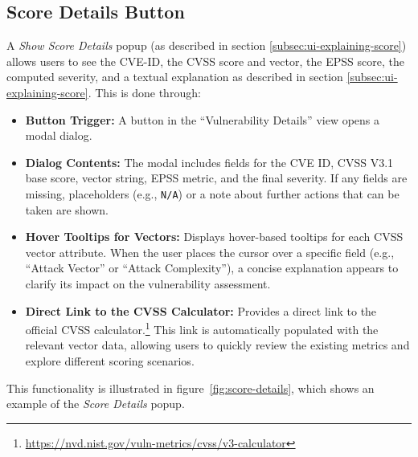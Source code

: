 \subsection{Score Details Button}
A \textit{Show Score Details} popup (as described in section \ref{subsec:ui-explaining-score}) allows users to see the \ac{CVE}-ID, the \ac{CVSS} score and vector, the \ac{EPSS} score, the computed severity, and a textual explanation as described in section \ref{subsec:ui-explaining-score}. This is done through:

\begin{itemize}
  \item \textbf{Button Trigger:} A button in the \enquote{Vulnerability Details} view opens a modal dialog.
  \item \textbf{Dialog Contents:} The modal includes fields for the \ac{CVE} ID, \ac{CVSS} V3.1 base score, vector string, \ac{EPSS} metric, and the final severity. If any fields are missing, placeholders (e.g., \texttt{N/A}) or a note about further actions that can be taken are shown.
  \item \textbf{Hover Tooltips for Vectors:} Displays hover-based tooltips for each \ac{CVSS} vector attribute. When the user places the cursor over a specific field (e.g., \enquote{Attack Vector} or \enquote{Attack Complexity}), a concise explanation appears to clarify its impact on the vulnerability assessment.
  \item \textbf{Direct Link to the \ac{CVSS} Calculator:} Provides a direct link to the official \ac{CVSS} calculator.\footnote{\url{https://nvd.nist.gov/vuln-metrics/cvss/v3-calculator}} This link is automatically populated with the relevant vector data, allowing users to quickly review the existing metrics and explore different scoring scenarios.
\end{itemize}

This functionality is illustrated in figure~\ref{fig:score-details}, which shows an example of the \textit{Score Details} popup.

